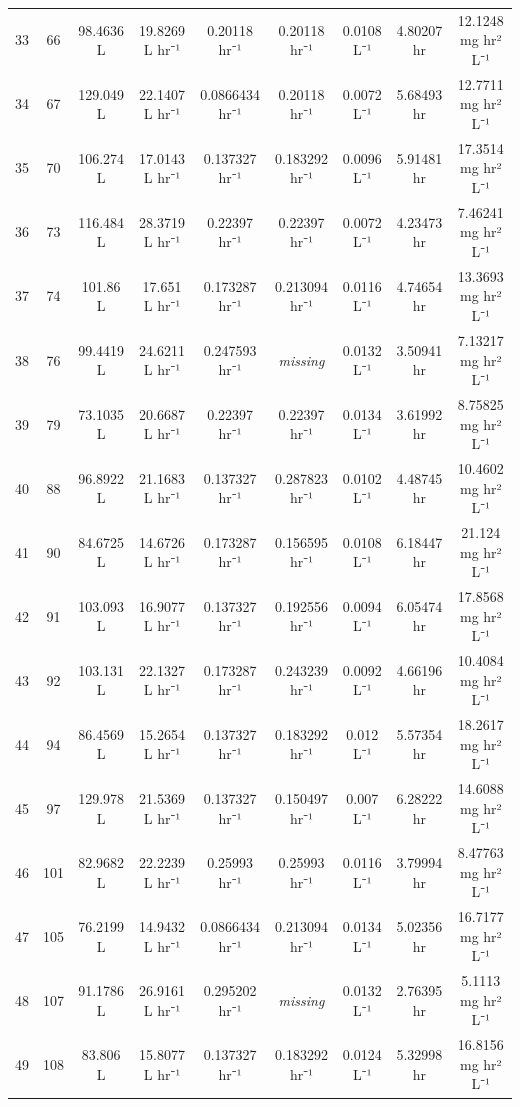 \documentclass[12pt,a4paper]{article}
\begin{document}
\begin{tabular}{r|cccccccc}
	33 & 66 & 98.4636 L & 19.8269 L hr⁻¹ & 0.20118 hr⁻¹ & 0.20118 hr⁻¹ & 0.0108 L⁻¹ & 4.80207 hr & 12.1248 mg hr² L⁻¹ \\
	34 & 67 & 129.049 L & 22.1407 L hr⁻¹ & 0.0866434 hr⁻¹ & 0.20118 hr⁻¹ & 0.0072 L⁻¹ & 5.68493 hr & 12.7711 mg hr² L⁻¹ \\
	35 & 70 & 106.274 L & 17.0143 L hr⁻¹ & 0.137327 hr⁻¹ & 0.183292 hr⁻¹ & 0.0096 L⁻¹ & 5.91481 hr & 17.3514 mg hr² L⁻¹ \\
	36 & 73 & 116.484 L & 28.3719 L hr⁻¹ & 0.22397 hr⁻¹ & 0.22397 hr⁻¹ & 0.0072 L⁻¹ & 4.23473 hr & 7.46241 mg hr² L⁻¹ \\
	37 & 74 & 101.86 L & 17.651 L hr⁻¹ & 0.173287 hr⁻¹ & 0.213094 hr⁻¹ & 0.0116 L⁻¹ & 4.74654 hr & 13.3693 mg hr² L⁻¹ \\
	38 & 76 & 99.4419 L & 24.6211 L hr⁻¹ & 0.247593 hr⁻¹ & \emph{missing} & 0.0132 L⁻¹ & 3.50941 hr & 7.13217 mg hr² L⁻¹ \\
	39 & 79 & 73.1035 L & 20.6687 L hr⁻¹ & 0.22397 hr⁻¹ & 0.22397 hr⁻¹ & 0.0134 L⁻¹ & 3.61992 hr & 8.75825 mg hr² L⁻¹ \\
	40 & 88 & 96.8922 L & 21.1683 L hr⁻¹ & 0.137327 hr⁻¹ & 0.287823 hr⁻¹ & 0.0102 L⁻¹ & 4.48745 hr & 10.4602 mg hr² L⁻¹ \\
	41 & 90 & 84.6725 L & 14.6726 L hr⁻¹ & 0.173287 hr⁻¹ & 0.156595 hr⁻¹ & 0.0108 L⁻¹ & 6.18447 hr & 21.124 mg hr² L⁻¹ \\
	42 & 91 & 103.093 L & 16.9077 L hr⁻¹ & 0.137327 hr⁻¹ & 0.192556 hr⁻¹ & 0.0094 L⁻¹ & 6.05474 hr & 17.8568 mg hr² L⁻¹ \\
	43 & 92 & 103.131 L & 22.1327 L hr⁻¹ & 0.173287 hr⁻¹ & 0.243239 hr⁻¹ & 0.0092 L⁻¹ & 4.66196 hr & 10.4084 mg hr² L⁻¹ \\
	44 & 94 & 86.4569 L & 15.2654 L hr⁻¹ & 0.137327 hr⁻¹ & 0.183292 hr⁻¹ & 0.012 L⁻¹ & 5.57354 hr & 18.2617 mg hr² L⁻¹ \\
	45 & 97 & 129.978 L & 21.5369 L hr⁻¹ & 0.137327 hr⁻¹ & 0.150497 hr⁻¹ & 0.007 L⁻¹ & 6.28222 hr & 14.6088 mg hr² L⁻¹ \\
	46 & 101 & 82.9682 L & 22.2239 L hr⁻¹ & 0.25993 hr⁻¹ & 0.25993 hr⁻¹ & 0.0116 L⁻¹ & 3.79994 hr & 8.47763 mg hr² L⁻¹ \\
	47 & 105 & 76.2199 L & 14.9432 L hr⁻¹ & 0.0866434 hr⁻¹ & 0.213094 hr⁻¹ & 0.0134 L⁻¹ & 5.02356 hr & 16.7177 mg hr² L⁻¹ \\
	48 & 107 & 91.1786 L & 26.9161 L hr⁻¹ & 0.295202 hr⁻¹ & \emph{missing} & 0.0132 L⁻¹ & 2.76395 hr & 5.1113 mg hr² L⁻¹ \\
	49 & 108 & 83.806 L & 15.8077 L hr⁻¹ & 0.137327 hr⁻¹ & 0.183292 hr⁻¹ & 0.0124 L⁻¹ & 5.32998 hr & 16.8156 mg hr² L⁻¹ \\

\end{tabular}
\end{document}
